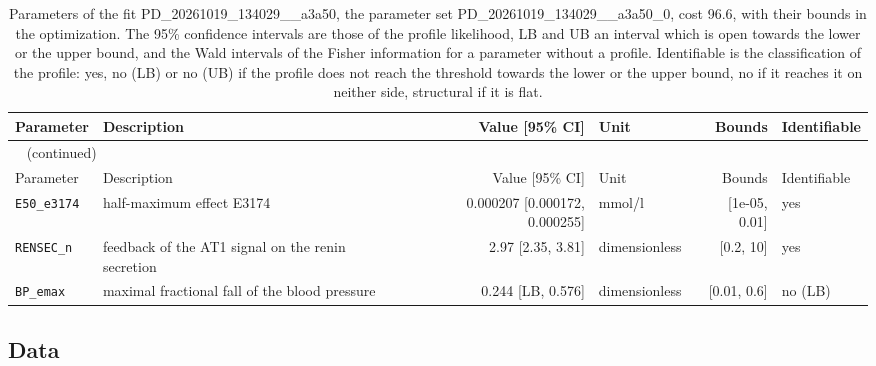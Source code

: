 \begin{longtable}{llrlrl}
\caption{Parameters of the fit PD\_20261019\_134029\_\_a3a50, the parameter set PD\_20261019\_134029\_\_a3a50\_0, cost 96.6, with their bounds in the optimization. The 95\% confidence intervals are those of the profile likelihood, LB and UB an interval which is open towards the lower or the upper bound, and the Wald intervals of the Fisher information for a parameter without a profile. Identifiable is the classification of the profile: yes, no (LB) or no (UB) if the profile does not reach the threshold towards the lower or the upper bound, no if it reaches it on neither side, structural if it is flat.}\label{tab:parameters:PD_20261019_134029__a3a50} \\
\toprule
Parameter & Description & Value [95\% CI] & Unit & Bounds & Identifiable \\
\midrule
\endfirsthead
\multicolumn{6}{l}{\small\tablename~\thetable{} (continued)} \\
\toprule
Parameter & Description & Value [95\% CI] & Unit & Bounds & Identifiable \\
\midrule
\endhead
\bottomrule
\endlastfoot
\texttt{E50\_e3174} & half-maximum effect E3174 & 0.000207 [0.000172, 0.000255] & mmol/l & [1e-05, 0.01] & yes \\
\texttt{RENSEC\_n} & feedback of the AT1 signal on the renin secretion & 2.97 [2.35, 3.81] & dimensionless & [0.2, 10] & yes \\
\texttt{BP\_emax} & maximal fractional fall of the blood pressure & 0.244 [LB, 0.576] & dimensionless & [0.01, 0.6] & no (LB) \\
\end{longtable}

\subsection{Data}

